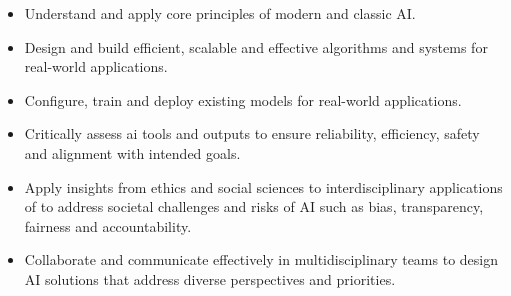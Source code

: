 

\begin{itemize}
        \item Understand and apply core principles of modern and classic AI.

        \item Design and build efficient, scalable and effective algorithms and systems for real-world applications.

        \item Configure, train and deploy existing models for real-world applications.

        \item Critically assess ai tools and outputs to ensure reliability, efficiency, safety and alignment with intended goals.

        \item Apply insights from ethics and social sciences to interdisciplinary applications of \ai{} to address societal challenges and risks of AI such as bias, transparency, fairness and accountability. 

        \item Collaborate and communicate effectively in multidisciplinary teams to design AI solutions that address diverse perspectives and priorities.
\end{itemize} 